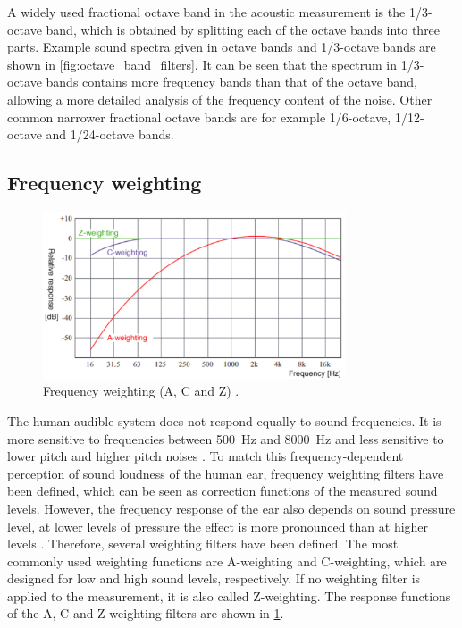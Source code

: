 \noindent A widely used fractional octave band in the acoustic measurement is the 1/3-octave band, which is obtained by splitting each of the octave bands into three parts. Example sound spectra given in octave bands and 1/3-octave bands are shown in \cref{fig:octave_band_filters}. It can be seen that the spectrum in 1/3-octave bands contains more frequency bands than that of the octave band, allowing a more detailed analysis of the frequency content of the noise. Other common narrower fractional octave bands are for example 1/6-octave, 1/12-octave and 1/24-octave bands.

\newpage
\subsection{Frequency weighting}

\begin{figure}[H]
	\centering
	\includegraphics[width=0.8\textwidth]{fig/frequency_weighting.png}
	\caption{Frequency weighting (A, C and Z) \cite{Frquency_weighting}.}
	\label{fig:weighting}
\end{figure}

The human audible system does not respond equally to sound frequencies. It is more sensitive to frequencies between \SI{500}{\hertz} and \SI{8000}{\hertz} and less sensitive to lower pitch and higher pitch noises \cite{weighting_filters}. To match this frequency-dependent perception of sound loudness of the human ear, frequency weighting filters have been defined, which can be seen as correction functions of the measured sound levels. However, the frequency response of the ear also depends on sound pressure level, at lower levels of pressure the effect is more pronounced than at higher levels \cite{heutschi_lecture_2016}. Therefore, several weighting filters have been defined. The most commonly used weighting functions are A-weighting and C-weighting, which are designed for low and high sound levels, respectively. If no weighting filter is applied to the measurement, it is also called Z-weighting. The response functions of the A, C and Z-weighting filters are shown in \cref{fig:weighting}.

